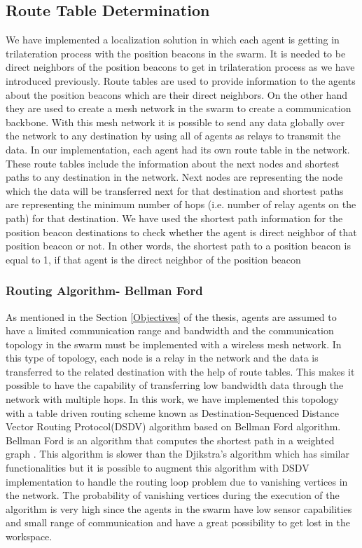 \subsection{Route Table Determination}
We have implemented a localization solution in which each agent is getting in trilateration process with the position beacons in the swarm. It is needed to be direct neighbors of the position beacons to get in trilateration process as we have introduced previously. Route tables are used to provide information to the agents about the position beacons which are their direct neighbors. On the other hand they are used to create a mesh network in the swarm to create a communication backbone. With this mesh network it is possible to send any data globally over the network to any destination by using all of agents as relays to transmit the data.
In our implementation, each agent had its own route table in the network. These route tables include the information about the next nodes and shortest paths to any destination in the network. Next nodes are representing the node which the data will be transferred next for that destination and shortest paths are representing the minimum number of hops (i.e. number of relay agents on the path) for that destination. We have used the shortest path information for the position beacon destinations to check whether the agent is direct neighbor of that position beacon or not. In other words, the shortest path to a position beacon is equal to 1, if that agent is the direct neighbor of the position beacon


	
\subsubsection{Routing Algorithm- Bellman Ford}
As mentioned in the Section \ref{Objectives} of the thesis, agents are assumed to have a limited communication range and bandwidth and the communication topology in the swarm must be implemented with a wireless mesh network. In this type of topology, each node is a relay in the network and the data is transferred to the related destination with the help of route tables. This makes it possible to have the capability of transferring low bandwidth data through the network with multiple hops.  In this work, we have implemented this topology with a table driven routing scheme known as Destination-Sequenced Distance Vector Routing Protocol(DSDV) algorithm based on Bellman Ford algorithm. Bellman Ford is an algorithm that computes the shortest path in a weighted graph \cite{wiki_bellman}. This algorithm is slower than the Djikstra's algorithm which has similar functionalities but it is possible to augment this algorithm with DSDV implementation to handle the routing loop problem due to vanishing vertices in the network\cite{wiki_bellman}. The probability of vanishing vertices during the execution of the algorithm is very high since the agents in the swarm have low sensor capabilities and small range of communication and have a great possibility to get lost in the workspace.
	
